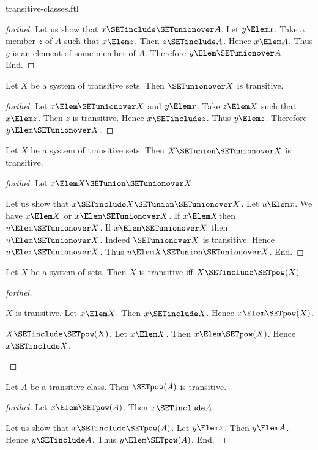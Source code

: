 \documentclass{stex}
\begin{document}
\begin{smodule}{transitive-classes.ftl}
\begin{proof}[forthel]
  Let us show that $x \SETinclude \SETunionover A$.
    Let $y \Elem x$.
    Take a member $z$ of $A$ such that $x \Elem z$.
    Then $z \SETinclude A$.
    Hence $x \Elem A$.
    Thus $y$ is an element of some member of $A$.
    Therefore $y \Elem \SETunionover A$.
  End.
\end{proof}

\begin{proposition}[forthel]
  Let $X$ be a system of transitive sets.
  Then $\SETunionover X$ is transitive.
\end{proposition}
\begin{proof}[forthel]
  Let $x \Elem \SETunionover X$ and $y \Elem x$.
  Take $z \Elem X$ such that $x \Elem z$.
  Then $z$ is transitive.
  Hence $x \SETinclude z$.
  Thus $y \Elem z$.
  Therefore $y \Elem \SETunionover X$.
\end{proof}

\begin{proposition}[forthel]
  Let $X$ be a system of transitive sets.
  Then $X \SETunion \SETunionover X$ is transitive.
\end{proposition}
\begin{proof}[forthel]
  Let $x \Elem X \SETunion \SETunionover X$.

  Let us show that $x \SETinclude X \SETunion \SETunionover X$.
    Let $u \Elem x$.
    We have $x \Elem X$ or $x \Elem \SETunionover X$.
    If $x \Elem X$then $u \Elem \SETunionover X$.
    If $x \Elem \SETunionover X$ then $u \Elem \SETunionover X$.
    Indeed $\SETunionover X$ is transitive.
    Hence $u \Elem \SETunionover X$.
    Thus $u \Elem X \SETunion \SETunionover X$.
  End.
\end{proof}

\begin{proposition}[forthel]
  Let $X$ be a system of sets.
  Then $X$ is transitive iff $X \SETinclude \SETpow(X)$.
\end{proposition}
\begin{proof}[forthel]
  \begin{case}{$X$ is transitive.}
    Let $x \Elem X$.
    Then $x \SETinclude X$.
    Hence $x \Elem \SETpow(X)$.
  \end{case}

  \begin{case}{$X \SETinclude \SETpow(X)$.}
    Let $x \Elem X$.
    Then $x \Elem \SETpow(X)$.
    Hence $x \SETinclude X$.
  \end{case}
\end{proof}

\begin{proposition}[forthel]
  Let $A$ be a transitive class.
  Then $\SETpow(A)$ is transitive.
\end{proposition}
\begin{proof}[forthel]
  Let $x \Elem \SETpow(A)$.
  Then $x \SETinclude A$.

  Let us show that $x \SETinclude \SETpow(A)$.
    Let $y \Elem x$.
    Then $y \Elem A$.
    Hence $y \SETinclude A$.
    Thus $y \Elem \SETpow(A)$.
  End.
\end{proof}
\end{smodule}
\end{document}
